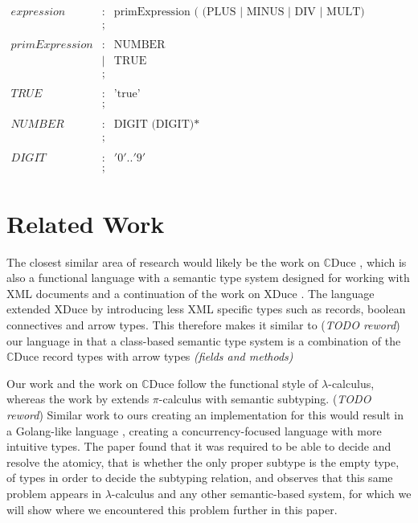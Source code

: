 \documentclass{l4proj}
\begin{document}
$$
    \begin{array}{llll}
        expression     & : & \mbox{primExpression ( (PLUS | MINUS | DIV | MULT) primExpression)?}
        \\
                       & ;
        \\
        \\
        primExpression & : & \mbox{NUMBER}
        \\
                       & | & \mbox{TRUE}
        \\
                       & ; & 
        \\
        \\
        TRUE           & : & \mbox{'true'}
        \\
                       & ; & 
        \\
        \\
        NUMBER         & : & \mbox{DIGIT (DIGIT)*}
        \\
                       & ; & 
        \\
        \\
        DIGIT          & : & '0'..'9'
        \\
                       & ; & 
    \end{array}
$$

\section{Related Work}
The closest similar area of research would likely be the work on $\mathbb{C}$Duce
\citep{Benzaken2003}, which is also a functional language with a semantic type system designed for
working with XML documents and a continuation of the work on XDuce \citep{Hosoya2003}. The language
extended XDuce by introducing less XML specific types such as records, boolean connectives and arrow
types. This therefore makes it similar to (\textit{TODO reword}) our language in that a class-based
semantic type system is a combination of the $\mathbb{C}$Duce record types with arrow types
\textit{(fields and methods)}

Our work and the work on $\mathbb{C}$Duce follow the functional style of $\lambda$-calculus,
whereas the work by \citet{Castagna2008} extends $\pi$-calculus with semantic subtyping.
(\textit{TODO reword}) Similar work to ours creating an implementation for this would result in a
Golang-like language \citep{Meyerson2014}, creating a concurrency-focused language with more
intuitive types. The paper found that it was required to be able to decide and resolve the atomicy,
that is whether the only proper subtype is the empty type, of types in order to decide the subtyping
relation, and observes that this same problem appears in $\lambda$-calculus and any other
semantic-based system, for which we will show where we encountered this problem further in this
paper.
\end{document}
